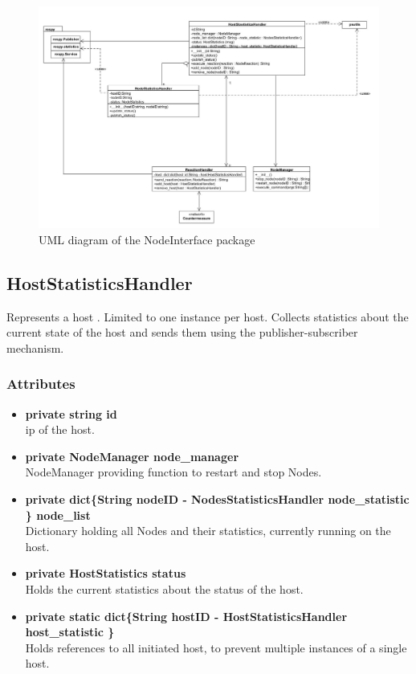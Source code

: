 
\begin{figure}[!ht]
\begin{center}
\includegraphics[width = 1.0 \linewidth]{./diagram_pictures/erfassung.jpg}
\caption{UML diagram of the NodeInterface package}
\end{center}
\end{figure}
\newpage

\subsection{HostStatisticsHandler}
Represents a host . Limited to one instance per host. Collects statistics about the current state of the host and sends them using the publisher-subscriber mechanism.

\subsubsection{Attributes}
\begin{itemize}
	\item \textbf{private string id}\\
			ip of the host.
	\item \textbf{private NodeManager node\_manager}\\
			NodeManager providing function to restart and stop Nodes.
	\item \textbf{private  dict\{String nodeID  - NodesStatisticsHandler node\_statistic  \} node\_list}\\
			Dictionary holding all Nodes and their statistics, currently running on the host.
	\item \textbf{private HostStatistics status}\\
			Holds the current statistics about the  status of the host.
	\item \textbf{private static dict\{String hostID   - HostStatisticsHandler host\_statistic \}}\\
			Holds references to all initiated host, to prevent multiple instances of a single host.
\end{itemize}


